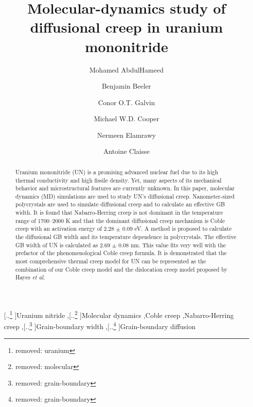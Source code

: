 \documentclass[preprint,12pt,sort&compress]{elsarticle} %
\newcommand{\?}{\stackrel{?}{=}}
\providecommand{\DIFaddtex}[1]{{\sf #1}} %
\providecommand{\DIFdeltex}[1]{{[..\footnote{removed: #1} ]}} %
\providecommand{\DIFaddbegin}{\protect\color{blue}} %
\providecommand{\DIFaddend}{\protect\color{black}} %
\providecommand{\DIFdelbegin}{\protect\color{red}} %
\providecommand{\DIFdelend}{\protect\color{black}} %
\providecommand{\DIFadd}[1]{\texorpdfstring{\DIFaddtex{#1}}{#1}} %
\providecommand{\DIFdel}[1]{\texorpdfstring{\DIFdeltex{#1}}{}} %
\newcommand{\DIFscaledelfig}{0.5}
\newlength{\DIFdelgraphicswidth} %
\newlength{\DIFdelgraphicsheight} %
\newcommand{\DIFaddincludegraphics}[2][]{{\color{blue}\fbox{\DIFOincludegraphics[#1]{#2}}}} %
\newcommand{\DIFdelincludegraphics}[2][]{%
\sbox{\DIFdelgraphicsbox}{\DIFOincludegraphics[#1]{#2}}%
\settoboxwidth{\DIFdelgraphicswidth}{\DIFdelgraphicsbox} %
\settoboxtotalheight{\DIFdelgraphicsheight}{\DIFdelgraphicsbox} %
\scalebox{\DIFscaledelfig}{%
\parbox[b]{\DIFdelgraphicswidth}{\usebox{\DIFdelgraphicsbox}\\[-\baselineskip] \rule{\DIFdelgraphicswidth}{0em}}\llap{\resizebox{\DIFdelgraphicswidth}{\DIFdelgraphicsheight}{%
\setlength{\unitlength}{\DIFdelgraphicswidth}%
\begin{picture}(1,1)%
\thicklines\linethickness{2pt} %
{\color[rgb]{1,0,0}\put(0,0){\framebox(1,1){}}}%
{\color[rgb]{1,0,0}\put(0,0){\line( 1,1){1}}}%
{\color[rgb]{1,0,0}\put(0,1){\line(1,-1){1}}}%
\end{picture}%
}\hspace*{3pt}}} %
} %
\DeclareRobustCommand{\DIFaddbegin}{\DIFOaddbegin \let\includegraphics\DIFaddincludegraphics} %
\DeclareRobustCommand{\DIFaddend}{\DIFOaddend \let\includegraphics\DIFOincludegraphics} %
\DeclareRobustCommand{\DIFdelbegin}{\DIFOdelbegin \let\includegraphics\DIFdelincludegraphics} %
\DeclareRobustCommand{\DIFdelend}{\DIFOaddend \let\includegraphics\DIFOincludegraphics} %
\begin{document}
\begin{frontmatter}

\title{Molecular-dynamics study of diffusional creep in uranium mononitride}

\author[ncsu]{Mohamed AbdulHameed}
\author[ncsu,inl]{Benjamin Beeler}
\author[lanl]{Conor O.T. Galvin}
\author[lanl]{Michael W.D. Cooper}
\author[ncsu]{Nermeen Elamrawy}
\author[west]{Antoine Claisse}

\address[ncsu]{Department of Nuclear Engineering, North Carolina State University, Raleigh, NC 27695}
\address[inl]{Idaho National Laboratory, Idaho Falls, ID 83415}
\address[west]{Westinghouse Electric Sweden, Västerås, SE 72163, Sweden}
\address[lanl]{Los Alamos National Laboratory, Los Alamos, NM 87545}

\begin{abstract}

Uranium mononitride (UN) is a promising advanced nuclear fuel due to its high thermal conductivity and high fissile density. Yet, many aspects of its mechanical behavior and microstructural features are currently unknown. In this paper, molecular dynamics (MD) simulations are used to study UN's diffusional creep. Nanometer-sized polycrystals are used to simulate diffusional creep and to calculate an effective GB width. It is found that Nabarro-Herring creep is not dominant in the temperature range of 1700--2000 K and that the dominant diffusional creep mechanism is Coble creep with an activation energy of 2.28 $\pm$ 0.09 eV. A method is proposed to calculate the diffusional GB width and its temperature dependence in polycrystals. The effective GB width of UN is calculated as 2.69 $\pm$ 0.08 nm. This value fits very well with the prefactor of the phenomenological Coble creep formula. It is demonstrated that the most comprehensive thermal creep model for UN can be represented as the combination of our Coble creep model and the dislocation creep model proposed by Hayes \textit{et al.}

\end{abstract}

\begin{keyword}
\DIFdelbegin \DIFdel{uranium }\DIFdelend \DIFaddbegin \DIFadd{Uranium }\DIFaddend nitride \sep \DIFdelbegin \DIFdel{molecular }\DIFdelend \DIFaddbegin \DIFadd{Molecular }\DIFaddend dynamics \sep Coble creep \sep Nabarro-Herring creep \sep \DIFdelbegin \DIFdel{grain-boundary }\DIFdelend \DIFaddbegin \DIFadd{Grain-boundary }\DIFaddend width \sep \DIFdelbegin \DIFdel{grain-boundary }\DIFdelend \DIFaddbegin \DIFadd{Grain-boundary }\DIFaddend diffusion
\end{keyword}

\end{frontmatter}
\end{document}
